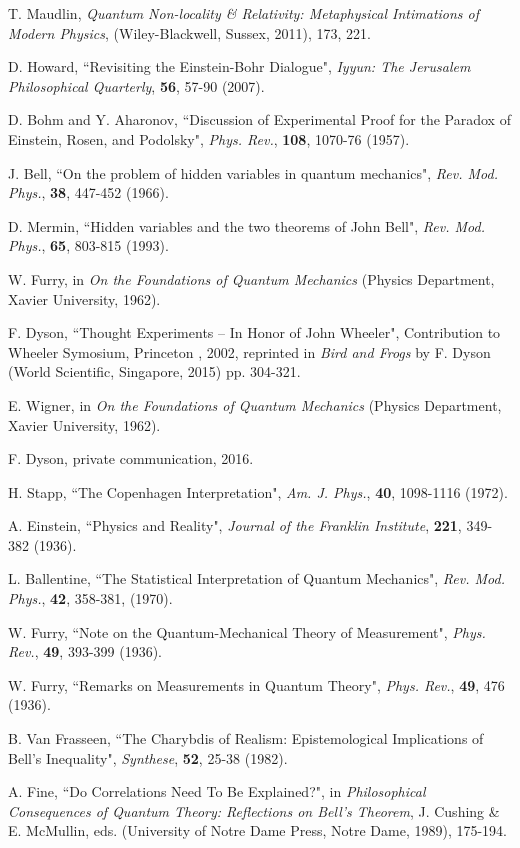\documentclass[12pt]{article}
\begin{document}
\begin{thebibliography}{99}
 T. Maudlin, {\it Quantum Non-locality \& Relativity: Metaphysical Intimations of Modern Physics}, (Wiley-Blackwell, Sussex, 2011), 173, 221.

 D. Howard, ``Revisiting the Einstein-Bohr Dialogue", {\it Iyyun: The Jerusalem Philosophical Quarterly}, \textbf{56}, 57-90 (2007).

 D. Bohm and Y. Aharonov, ``Discussion of Experimental Proof for the Paradox of Einstein, Rosen, and Podolsky", {\it Phys. Rev.}, \textbf{108}, 1070-76 (1957).

 J. Bell, ``On the problem of hidden variables in quantum mechanics", {\it Rev. Mod. Phys.}, \textbf{38}, 447-452 (1966).

 D. Mermin, ``Hidden variables and the two theorems of John Bell", {\it Rev. Mod. Phys.}, \textbf{65}, 803-815 (1993).

 W. Furry, in {\it On the Foundations of Quantum Mechanics} (Physics Department, Xavier University, 1962).

 F. Dyson, ``Thought Experiments -- In Honor of John Wheeler", Contribution to Wheeler Symosium, Princeton , 2002, reprinted in {\it Bird and Frogs} by F. Dyson (World Scientific, Singapore, 2015) pp. 304-321.

 E. Wigner, in {\it On the Foundations of Quantum Mechanics} (Physics Department, Xavier University, 1962).

 F. Dyson, private communication, 2016.

 H. Stapp, ``The Copenhagen Interpretation", {\it Am. J. Phys.}, \textbf{40}, 1098-1116 (1972).

 A. Einstein, ``Physics and Reality", {\it Journal of the Franklin Institute}, \textbf{221}, 349-382 (1936).

 L. Ballentine, ``The Statistical Interpretation of Quantum Mechanics", {\it Rev. Mod. Phys.}, \textbf{42}, 358-381, (1970).

 W. Furry, ``Note on the Quantum-Mechanical Theory of Measurement", {\it Phys. Rev.}, \textbf{49}, 393-399 (1936).

 W. Furry, ``Remarks on Measurements in Quantum Theory", {\it Phys. Rev.}, \textbf{49}, 476 (1936).

 B. Van Frasseen, ``The Charybdis of Realism: Epistemological Implications of Bell's Inequality", {\it Synthese}, \textbf{52}, 25-38 (1982).

 A. Fine, ``Do Correlations Need To Be Explained?", in {\it Philosophical Consequences of Quantum Theory: Reflections on Bell's Theorem}, J. Cushing \& E. McMullin, eds. (University of Notre Dame Press, Notre Dame, 1989), 175-194.

\end{thebibliography}
\end{document}
